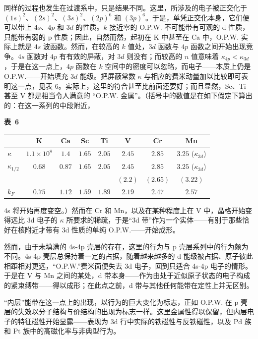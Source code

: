同样的过程也发生在过渡系中，只是结果不同。这里，所涉及的电子被正交化于 $(1s)^2$、$(2s)^2$、$(3s)^2$、$(2p)^6$ 和 $(3p)^6$。于是，单凭正交化本身，它们便可以带上 $4s$、$4p$ 和 $3d$ 的性质。$k$ 接近零的 O.P.W. 不可能带有可观的 d 性质，只能带有弱的 p 性质；因此，自然而然，起初在 K 中甚至在 Ca 中，O.P.W. 实际上就是 $4s$ 波函数。然而，在较高的 $k$ 值处，$3d$ 函数与 $4p$ 函数之间开始出现竞争。$4s$ 函数对 $4p$ 有有效的屏蔽，对 $3d$ 则没有；而较高的 $n$ 值意味着 $\kappa_{4p} < \kappa_{3d}$，于是在这一点上，$4p$ 函数在 $k$ 空间中的密度可以忽略，而电子——本质上仍是 O.P.W.——开始填充 $3d$ 能级。把屏蔽常数 $\kappa$ 与相应的费米动量加以比较即可表明这一点，见表 6。实际上，这里的符合甚至比前面还要好；而且显然，Sc、Ti 甚至 V 都是相当令人满意的 “O.P.W. 金属”。（括号中的数值是在如下假定下算出的：在这一系列的中段附近，
\begin{table}[htbp]
\centering
{\bfseries 表~6}\\[5pt]
\begin{tabular}{lccccccc}
\toprule
 & K & Ca & Sc & Ti & V & Cr & Mn\\
\midrule
$\kappa$ & $1.1\times10^{8}$ & $1.4$ & $1.65$ & $2.05$ & $2.45$ & $2.85$ & $3.25$ ($\kappa_{3d}$)\\
$\kappa_{1/2}$ & $0.68$ & $0.87$ & $1.65$ & $2.05$ & $2.45$ & $2.85$ & $3.25$ ($\kappa_{3d}$)\\
 & & & & & $(2.2)$ & $(2.65)$ & $(3.22)$\\
$k_F$ & $0.75$ & $1.12$ & $1.59$ & $1.89$ & $2.19$ & $2.47$ & $2.57$\\
\bottomrule
\end{tabular}
\end{table}
4s 将开始再度变空。）然而在 Cr 和 Mn，以及在某种程度上在 V 中，晶格开始变得远比 3d 电子的 $\kappa$ 所要求的稀疏，于是“3d 带”作为一个实体——有别于那些恰好在核附近才带有 3d 性质的单纯 O.P.W.——开始成形。

然而，由于未填满的 4s-4p 壳层的存在，这里的行为与 p 壳层系列中的行为颇为不同。4s-4p 壳层总保持着一定的占据，随着越来越多的 d 能级被占据、原子彼此相距相对更远，“O.P.W.”费米面便失去 3d 电子，回到只适合 4s-4p 电子的情形。于是在 V 与 Mn 之间的某处，d 带本身——作为由处于近似原子状态的电子构成的紧束缚带——得以成形；在此点之前，d 带与其他任何能带在定性上并无区别。

“内层”能带在这一点上的出现，以行为的巨大变化为标志，正如 O.P.W. 在 p 壳层的失效以分子结构与价结构的出现为标志一样。这里金属性得以保留，但内层电子的特征磁性开始显露——表现为 3d 行中实际的铁磁性与反铁磁性，以及 Pd 族和 Pt 族中的高磁化率与非典型行为。

